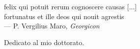 
\cleardoublepage
{}
\thispagestyle{empty}

\vspace*{3cm}

\begin{center}
felix qui potuit rerum cognoscere causas [...]\\
fortunatus et ille deos qui nouit agrestis \\ \medskip
--- P. Vergilius Maro, \textit{Georgicon}
\end{center}

\medskip

\begin{center}
	Dedicato al mio dottorato.
\end{center}
